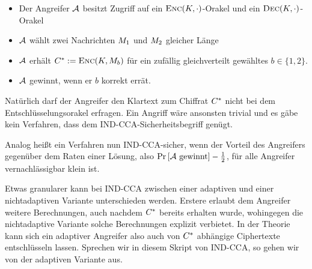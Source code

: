 \begin{itemize}
	\item Der Angreifer $\mathcal{A}$ besitzt Zugriff auf ein $\textsc{Enc}(K,\cdot)$-Orakel und ein $\textsc{Dec}(K,\cdot)$-Orakel
	\item $\mathcal{A}$ wählt zwei Nachrichten $M_1$ und $M_2$ gleicher Länge
	\item $\mathcal{A}$ erhält $C^{*} := \textsc{Enc}(K, M_{b})$  für ein zufällig gleichverteilt gewähltes $b \in \{1, 2\}$.
	\item $\mathcal{A}$ gewinnt, wenn er $b$ korrekt errät.
\end{itemize} 

Natürlich darf der Angreifer den Klartext zum Chiffrat $C^{*}$ nicht bei dem Entschlüsselungsorakel erfragen. Ein Angriff wäre ansonsten trivial und es gäbe kein Verfahren, dass dem IND-CCA-Sicherheitsbegriff genügt. 

Analog heißt ein Verfahren nun IND-CCA-sicher, wenn der Vorteil des Angreifers gegenüber dem Raten einer Lösung, also $\text{Pr} \left[ \mathcal{A}\ \text{gewinnt} \right] - \frac{1}{2}$, für alle Angreifer vernachlässigbar klein ist.

Etwas granularer kann bei IND-CCA zwischen einer adaptiven und einer nichtadaptiven Variante unterschieden werden. Erstere erlaubt dem Angreifer weitere Berechnungen, auch nachdem $C^{*}$ bereits erhalten wurde, wohingegen die nichtadaptive Variante solche Berechnungen explizit verbietet. In der Theorie kann sich ein adaptiver Angreifer also auch von $C^{*}$ abhängige Ciphertexte entschlüsseln lassen. Sprechen wir in diesem Skript von IND-CCA, so gehen wir von der adaptiven Variante aus.

